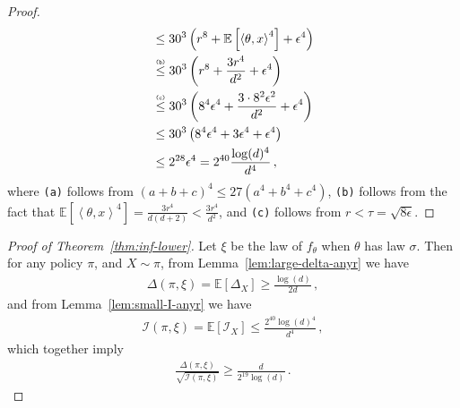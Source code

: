 \documentclass[letter, 12pt]{report}
\newcommand{\explan}[1]{\stackrel{\text{\tiny \texttt{#1}}}}
\newcommand{\ip}[1]{\left \langle #1 \right \rangle}
\newcommand{\paren}[1]{\left( #1 \right)}
\newcommand{\brak}[1]{\left[ #1 \right]}
\newcommand{\E}{\mathbb E}
\newcommand{\I}{\mathcal{I}}
\newcommand{\1}{\mathbf{1}}
\theoremstyle{plain}
\theoremstyle{definition}
\theoremstyle{remark}
\begin{document}
\begin{proof}
\begin{align*}
         & \leq
        30^3
        \paren{
            r^8
            +
            \E\brak{
                \ip{\theta, x}^4
            }
            +
            \epsilon^4
        }
        \\
         &
        \explan{(b)}
        \leq
        30^3
        \paren{
            r^8
            +
            \frac{3r^4}{d^2}
            +
            \epsilon^4
        }
        \\
         &
        \explan{(c)}
        \leq
        30^3
        \paren{
            8^4 \epsilon^4
            +
            \frac{3 \cdot 8^2 \epsilon^2}{d^2}
            +
            \epsilon^4
        }
        \\
         &
        \leq
        30^3
        \paren{
            8^4 \epsilon^4
            +
            3 \epsilon^4
            +
            \epsilon^4
        }
        \\
         & \leq 2^{28} \epsilon^4 = 2^{40} \frac{\log(d)^4}{d^4}
        \,,
    \end{align*}
    where \texttt{(a)} follows from $(a + b + c)^4 \leq 27(a^4 + b^4 + c^4)$,
    \texttt{(b)} follows from the fact that $\E[\ip{\theta, x}^4] = \frac{3r^4}{d(d+2)} < \frac{3r^4}{d^2}$,
    and \texttt{(c)} follows from $r < \tau = \sqrt{8\epsilon}$.
\end{proof}

\begin{proof}[Proof of Theorem~\ref{thm:inf-lower}]
    Let $\xi$ be the law of $f_\theta$ when $\theta$ has law $\sigma$.
    Then for any policy $\pi$, and $X \sim \pi$,
    from Lemma~\ref{lem:large-delta-anyr} we have
    \begin{align*}
        \Delta(\pi, \xi)
        =
        \E\brak{\Delta_X}
        \geq    \frac{\log(d)}{2d}\,,
    \end{align*}
    and from Lemma~\ref{lem:small-I-anyr} we have
    \begin{align*}
        \I(\pi, \xi) = \E[\I_X] \leq \frac{2^{40}\log(d)^4}{d^4} \,,
    \end{align*}
    which together imply
    \begin{align*}
        \frac{\Delta(\pi, \xi)}{\sqrt{\I(\pi, \xi)}}
        \geq \frac{d}{2^{19}\log(d)}\,.
    \end{align*}
\end{proof}
\end{document}
